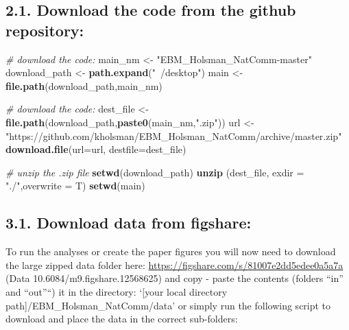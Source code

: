 \documentclass[]{article}
\newenvironment{Shaded}{\begin{snugshade}}{\end{snugshade}}
\newcommand{\KeywordTok}[1]{\textcolor[rgb]{0.13,0.29,0.53}{\textbf{{#1}}}}
\newcommand{\DataTypeTok}[1]{\textcolor[rgb]{0.13,0.29,0.53}{{#1}}}
\newcommand{\StringTok}[1]{\textcolor[rgb]{0.31,0.60,0.02}{{#1}}}
\newcommand{\CommentTok}[1]{\textcolor[rgb]{0.56,0.35,0.01}{\textit{{#1}}}}
\newcommand{\NormalTok}[1]{{#1}}
\begin{document}
\subsection{2.1. Download the code from the github
repository:}\label{download-the-code-from-the-github-repository}

\begin{Shaded}
\begin{Highlighting}[]
    \CommentTok{# download the code:}
    \NormalTok{main_nm       <-}\StringTok{ "EBM_Holsman_NatComm-master"}
    \NormalTok{download_path <-}\StringTok{ }\KeywordTok{path.expand}\NormalTok{(}\StringTok{"~/desktop"}\NormalTok{)}
    \NormalTok{main          <-}\StringTok{ }\KeywordTok{file.path}\NormalTok{(download_path,main_nm)}
   
    \CommentTok{# download the code:}
    \NormalTok{dest_file     <-}\StringTok{ }\KeywordTok{file.path}\NormalTok{(download_path,}\KeywordTok{paste0}\NormalTok{(main_nm,}\StringTok{".zip"}\NormalTok{))}
    \NormalTok{url           <-}\StringTok{"https://github.com/kholsman/EBM_Holsman_NatComm/archive/master.zip"}
    \KeywordTok{download.file}\NormalTok{(}\DataTypeTok{url=}\NormalTok{url, }\DataTypeTok{destfile=}\NormalTok{dest_file)}
    
    \CommentTok{# unzip the .zip file}
    \KeywordTok{setwd}\NormalTok{(download_path)}
    \KeywordTok{unzip} \NormalTok{(dest_file, }\DataTypeTok{exdir =} \StringTok{"./"}\NormalTok{,}\DataTypeTok{overwrite =} \NormalTok{T)}
    \KeywordTok{setwd}\NormalTok{(main)}
\end{Highlighting}
\end{Shaded}

\subsection{3.1. Download data from
figshare:}\label{download-data-from-figshare}

To run the analyses or create the paper figures you will now need to
download the large zipped data folder here:
\url{https://figshare.com/s/81007e2dd5edee0a5a7a} (Data
10.6084/m9.figshare.12568625) and copy - paste the contents (folders
``in'' and ``out''``) it in the directory: `{[}your local directory
path{]}/EBM\_Holsman\_NatComm/data' or simply run the following script
to download and place the data in the correct sub-folders:
\end{document}
